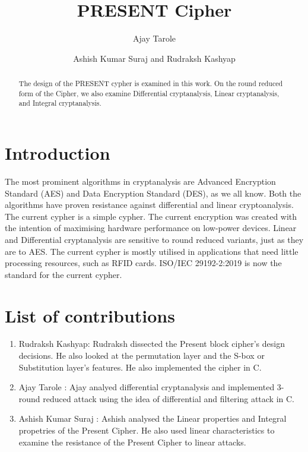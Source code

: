 \documentclass[journal=tosc,preprint]{iacrtrans}
\author{Ajay Tarole\inst{1} \and Ashish Kumar Suraj\inst{2} and Rudraksh Kashyap\inst{3}}
\institute{
  11840090, IIT Bhilai, \email{ajayt@iitbhilai.ac.in}
  \and
  1184230, IIT Bhilai, \email{ashishs@iitbhilai.ac.in}
  \and
  11840970, IIT Bhilai, \email{rudrakshk@iitbhilai.ac.in}
  
}
\title{PRESENT Cipher}
\begin{document}
\maketitle




\begin{abstract}
	The design of the PRESENT cypher is examined in this work. On the round reduced form of the Cipher, we also examine Differential cryptanalysis, Linear cryptanalysis, and Integral cryptanalysis.  
\end{abstract}


\section{Introduction}
The most prominent algorithms in cryptanalysis are Advanced Encryption Standard (AES) and Data Encryption Standard (DES), as we all know. Both the algorithms have proven resistance against differential and linear cryptoanalysis. The current cypher is a simple cypher.
The current encryption was created with the intention of maximising hardware performance on low-power devices. Linear and Differential cryptanalysis are sensitive to round reduced variants, just as they are to AES. The current cypher is mostly utilised in applications that need little processing resources, such as RFID cards. ISO/IEC 29192-2:2019 is now the standard for the current cypher. 
\section{List of contributions}
\begin{enumerate}
	\item Rudraksh Kashyap: Rudraksh dissected the Present block cipher's design decisions. He also looked at the permutation layer and the S-box or Substitution layer's features. He also implemented the cipher in C. 
	\item Ajay Tarole : Ajay analyed differential cryptanalysis and implemented 3-round reduced  attack using the idea of differential and filtering attack in C.
	\item Ashish Kumar Suraj : Ashish analysed the Linear properties and Integral propetries of the Present Cipher. He also used linear characteristics to examine the resistance of the Present Cipher to linear attacks.  
\end{enumerate}
\end{document}
